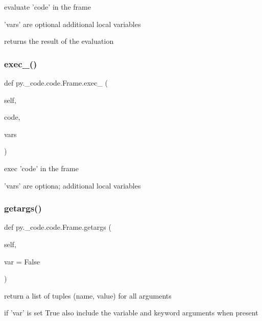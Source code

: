 \begin{DoxyVerb}evaluate 'code' in the frame

    'vars' are optional additional local variables

    returns the result of the evaluation
\end{DoxyVerb}
 \mbox{\label{classpy_1_1__code_1_1code_1_1_frame_a39b450ad358b486d79e789ed9f40f0c5}} 
\subsubsection{\texorpdfstring{exec\+\_\+()}{exec\_()}}
{\footnotesize\ttfamily def py.\+\_\+code.\+code.\+Frame.\+exec\+\_\+ (\begin{DoxyParamCaption}\item[{}]{self,  }\item[{}]{code,  }\item[{}]{vars }\end{DoxyParamCaption})}

\begin{DoxyVerb}exec 'code' in the frame

    'vars' are optiona; additional local variables
\end{DoxyVerb}
 \mbox{\label{classpy_1_1__code_1_1code_1_1_frame_a3d1533c08317c066291a7a7296675922}} 
\subsubsection{\texorpdfstring{getargs()}{getargs()}}
{\footnotesize\ttfamily def py.\+\_\+code.\+code.\+Frame.\+getargs (\begin{DoxyParamCaption}\item[{}]{self,  }\item[{}]{var = {\ttfamily False} }\end{DoxyParamCaption})}

\begin{DoxyVerb}return a list of tuples (name, value) for all arguments

    if 'var' is set True also include the variable and keyword
    arguments when present
\end{DoxyVerb}
 \mbox{\label{classpy_1_1__code_1_1code_1_1_frame_aa063a5e1033603b0c6e6b753884536bd}} 
